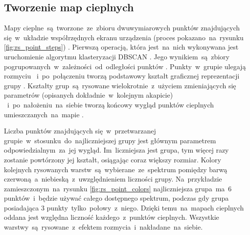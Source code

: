 \bigskip
{}

\subsection{Tworzenie map cieplnych}
Mapy cieplne~są~tworzone~ze~zbioru dwuwymiarowych punktów znajdujących się~w~układzie współrzędnych ekranu urządzenia (proces pokazano~na~rysunku \ref{fig:rs_point_steps}) . Pierwszą operacją, która jest~na~nich wykonywana jest uruchomienie algorytmu klasteryzacji DBSCAN \cite{DBSCAN_Wiki}. Jego wynikiem~są~zbiory pogrupowanych~w~zależności~od~odległości punktów . Punkty~w~grupie ulegają rozmyciu ~i~po~połączeniu tworzą podstawowy kształt graficznej reprezentacji grupy . Kształty grup~są~rysowane wielokrotnie~z~użyciem zmieniających się parametrów (opisanych dokładnie~w~kolejnym akapicie) ~i~po~nałożeniu~na~siebie tworzą końcowy wygląd punktów cieplnych umieszczanych~na~mapie .

\bigskip
{}

Liczba punktów znajdujących się~w~przetwarzanej grupie~w~stosunku~do~najliczniejszej grupy jest głównym parametrem odpowiedzialnym~za~jej wygląd. Im~liczniejsza jest grupa, tym więcej razy zostanie powtórzony jej kształt, osiągając coraz większy rozmiar. Kolory kolejnych rysowanych warstw~są~wybierane~ze~spektrum pomiędzy barwą czerwoną~a~niebieską~z~uwzględnieniem liczności grupy. Na~przykładzie zamieszczonym~na~rysunku \ref{fig:rs_point_colors} najliczniejsza grupa~ma~6 punktów~i~będzie używać całego dostępnego spektrum, podczas gdy grupa posiadająca 3 punkty~tylko~połowy~z~niego. Dzięki temu~na~mapach cieplnych oddana jest względna liczność każdego~z~punktów cieplnych. Wszystkie warstwy~są~rysowane~z~efektem rozmycia~i~nakładane~na~siebie. 

\bigskip
{}
